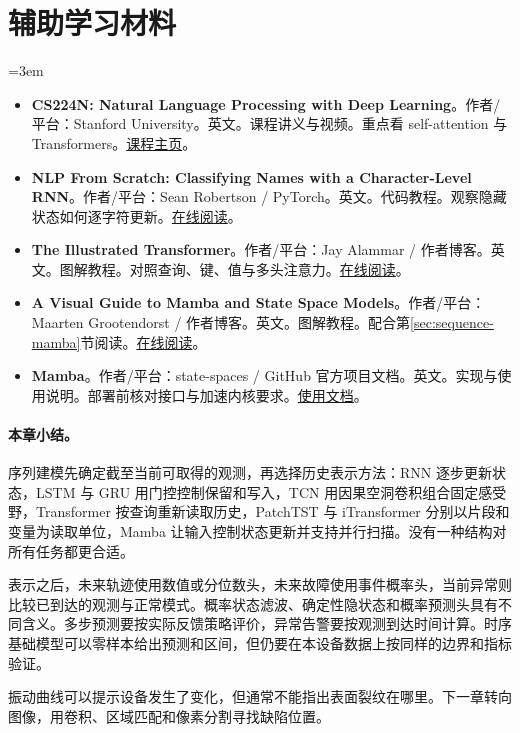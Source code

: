 \section*{辅助学习材料}
\begingroup
\emergencystretch=3em
\begin{itemize}
\item \textbf{CS224N: Natural Language Processing with Deep Learning}。作者/平台：Stanford University。英文。课程讲义与视频。重点看 self-attention 与 Transformers。\href{https://web.stanford.edu/class/cs224n/}{课程主页}。
\item \textbf{NLP From Scratch: Classifying Names with a Character-Level RNN}。作者/平台：Sean Robertson / PyTorch。英文。代码教程。观察隐藏状态如何逐字符更新。\href{https://docs.pytorch.org/tutorials/intermediate/char\_rnn\_classification\_tutorial.html}{在线阅读}。
\item \textbf{The Illustrated Transformer}。作者/平台：Jay Alammar / 作者博客。英文。图解教程。对照查询、键、值与多头注意力。\href{https://jalammar.github.io/illustrated-transformer/}{在线阅读}。
\item \textbf{A Visual Guide to Mamba and State Space Models}。作者/平台：Maarten Grootendorst / 作者博客。英文。图解教程。配合第\ref{sec:sequence-mamba}节阅读。\href{https://www.maartengrootendorst.com/blog/mamba/}{在线阅读}。
\item \textbf{Mamba}。作者/平台：state-spaces / GitHub 官方项目文档。英文。实现与使用说明。部署前核对接口与加速内核要求。\href{https://github.com/state-spaces/mamba\#usage}{使用文档}。
\end{itemize}
\endgroup
\paragraph{本章小结。}
序列建模先确定截至当前可取得的观测，再选择历史表示方法：RNN 逐步更新状态，LSTM 与 GRU 用门控控制保留和写入，TCN 用因果空洞卷积组合固定感受野，Transformer 按查询重新读取历史，PatchTST 与 iTransformer 分别以片段和变量为读取单位，Mamba 让输入控制状态更新并支持并行扫描。没有一种结构对所有任务都更合适。

表示之后，未来轨迹使用数值或分位数头，未来故障使用事件概率头，当前异常则比较已到达的观测与正常模式。概率状态滤波、确定性隐状态和概率预测头具有不同含义。多步预测要按实际反馈策略评价，异常告警要按观测到达时间计算。时序基础模型可以零样本给出预测和区间，但仍要在本设备数据上按同样的边界和指标验证。

振动曲线可以提示设备发生了变化，但通常不能指出表面裂纹在哪里。下一章转向图像，用卷积、区域匹配和像素分割寻找缺陷位置。
